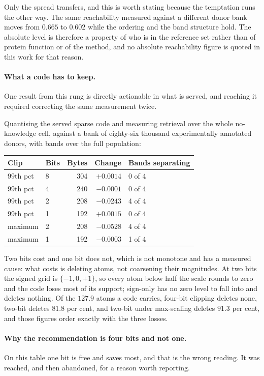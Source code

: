 Only the spread transfers, and this is worth stating because the
temptation runs the other way. The same reachability measured against a
different donor bank moves from $0.665$ to $0.602$ while the ordering and
the band structure hold. The absolute level is therefore a property of who
is in the reference set rather than of protein function or of the method,
and no absolute reachability figure is quoted in this work for that
reason.

\paragraph{What a code has to keep.}
One result from this rung is directly actionable in what is served, and
reaching it required correcting the same measurement twice.

Quantising the served sparse code and measuring retrieval over the whole
no-knowledge cell, against a bank of eighty-six thousand experimentally
annotated donors, with bands over the full population:

\begin{center}
\begin{tabular}{llrrl}
\toprule
Clip & Bits & Bytes & Change & Bands separating \\
\midrule
99th pct & 8 & 304 & $+0.0014$ & 0 of 4 \\
99th pct & 4 & 240 & $-0.0001$ & 0 of 4 \\
99th pct & 2 & 208 & $-0.0243$ & 4 of 4 \\
99th pct & 1 & 192 & $+0.0015$ & 0 of 4 \\
maximum  & 2 & 208 & $-0.0528$ & 4 of 4 \\
maximum  & 1 & 192 & $-0.0003$ & 1 of 4 \\
\bottomrule
\end{tabular}
\end{center}

Two bits cost and one bit does not, which is not monotone and has a
measured cause: what costs is deleting atoms, not coarsening their
magnitudes. At two bits the signed grid is $\{-1, 0, +1\}$, so every atom
below half the scale rounds to zero and the code loses most of its
support; sign-only has no zero level to fall into and deletes nothing. Of
the $127.9$ atoms a code carries, four-bit clipping deletes none, two-bit
deletes $81.8$ per cent, and two-bit under max-scaling deletes $91.3$ per
cent, and those figures order exactly with the three losses.

\paragraph{Why the recommendation is four bits and not one.}
On this table one bit is free and saves most, and that is the wrong
reading. It was reached, and then abandoned, for a reason worth reporting.

